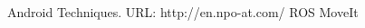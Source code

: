 \documentclass[letterpaper, 10 pt, conference]{ieeeconf}  %
\begin{document}








\begin{thebibliography}{99}

 Android Techniques. URL: http://en.npo-at.com/
 ROS
 MoveIt


\end{thebibliography}
\end{document}
